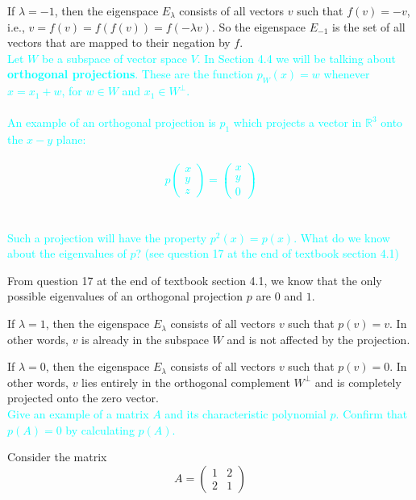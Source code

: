 \documentclass[fontsize=12pt]{scrartcl}
\begin{document}
\noindent
If $\lambda = -1$, then the eigenspace $E_{\lambda}$ consists of all vectors $v$ such that $f(v) = -v$, i.e., $v = f(v) = f(f(v)) = f(-\lambda v)$. So the eigenspace $E_{-1}$ is the set of all vectors that are mapped to their negation by $f$.
\\

\noindent
\textcolor{cyan}{Let $W$ be a subspace of vector space $V$. In Section 4.4 we will be talking about \textbf{orthogonal projections}. These are the function $p_W(x) = w$ whenever $x = x_1 + w$, for $w \in W$ and $x_1 \in W^{\perp}$.}\\
\\
\textcolor{cyan}{An example of an orthogonal projection is $p_1$ which projects a vector in $\mathbb{R}^3$ onto the $x-y$ plane:}\\
\\
\textcolor{cyan}{$$p\left( \begin{array}{c} x \\ y \\ z \end{array} \right) = \left( \begin{array}{c} x \\ y \\ 0 \end{array} \right)$$}\\
\\
\textcolor{cyan}{Such a projection will have the property $p^2(x) = p(x)$. What do we know about the eigenvalues of $p$? (see question 17 at the end of textbook section 4.1)}

\noindent
From question 17 at the end of textbook section 4.1, we know that the only possible eigenvalues of an orthogonal projection $p$ are $0$ and $1$.

\noindent
If $\lambda = 1$, then the eigenspace $E_{\lambda}$ consists of all vectors $v$ such that $p(v) = v$. In other words, $v$ is already in the subspace $W$ and is not affected by the projection.

\noindent
If $\lambda = 0$, then the eigenspace $E_{\lambda}$ consists of all vectors $v$ such that $p(v) = 0$. In other words, $v$ lies entirely in the orthogonal complement $W^{\perp}$ and is completely projected onto the zero vector.
\\

\noindent
\textcolor{cyan}{Give an example of a matrix $A$ and its characteristic polynomial $p$. Confirm that $p(A) = 0$ by calculating $p(A)$.}

\noindent
Consider the matrix
$$A = \left( \begin{array}{cc} 1 & 2 \\ 2 & 1 \end{array} \right)$$
\end{document}
